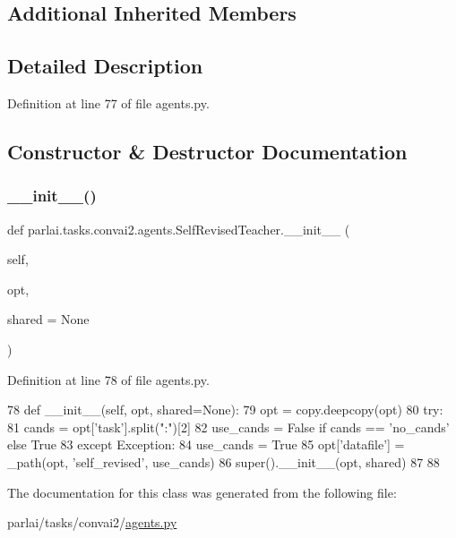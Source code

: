 \subsection*{Additional Inherited Members}


\subsection{Detailed Description}


Definition at line 77 of file agents.\+py.



\subsection{Constructor \& Destructor Documentation}
\mbox{\label{classparlai_1_1tasks_1_1convai2_1_1agents_1_1SelfRevisedTeacher_a7e0e99704aa5772d371e1b03dfe5cf5a}} 
\subsubsection{\texorpdfstring{\+\_\+\+\_\+init\+\_\+\+\_\+()}{\_\_init\_\_()}}
{\footnotesize\ttfamily def parlai.\+tasks.\+convai2.\+agents.\+Self\+Revised\+Teacher.\+\_\+\+\_\+init\+\_\+\+\_\+ (\begin{DoxyParamCaption}\item[{}]{self,  }\item[{}]{opt,  }\item[{}]{shared = {\ttfamily None} }\end{DoxyParamCaption})}



Definition at line 78 of file agents.\+py.


\begin{DoxyCode}
78     \textcolor{keyword}{def }\_\_init\_\_(self, opt, shared=None):
79         opt = copy.deepcopy(opt)
80         \textcolor{keywordflow}{try}:
81             cands = opt[\textcolor{stringliteral}{'task'}].split(\textcolor{stringliteral}{":"})[2]
82             use\_cands = \textcolor{keyword}{False} \textcolor{keywordflow}{if} cands == \textcolor{stringliteral}{'no\_cands'} \textcolor{keywordflow}{else} \textcolor{keyword}{True}
83         \textcolor{keywordflow}{except} Exception:
84             use\_cands = \textcolor{keyword}{True}
85         opt[\textcolor{stringliteral}{'datafile'}] = \_path(opt, \textcolor{stringliteral}{'self\_revised'}, use\_cands)
86         super().\_\_init\_\_(opt, shared)
87 
88 
\end{DoxyCode}


The documentation for this class was generated from the following file\+:\begin{DoxyCompactItemize}
\item 
parlai/tasks/convai2/\hyperlink{parlai_2tasks_2convai2_2agents_8py}{agents.\+py}\end{DoxyCompactItemize}
